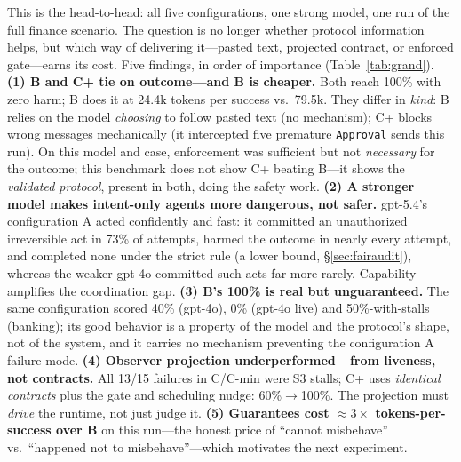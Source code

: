 \documentclass{article}
\begin{document}
This is the head-to-head: all five configurations, one strong model, one run of the full finance scenario. The question is no longer whether protocol information helps, but which way of delivering it---pasted text, projected contract, or enforced gate---earns its cost. Five findings, in order of importance (Table~\ref{tab:grand}). \textbf{(1) B and C+ tie on outcome---and B is cheaper.} Both reach 100\% with zero harm; B does it at 24.4k tokens per success vs.\ 79.5k. They differ in \emph{kind}: B relies on the model \emph{choosing} to follow pasted text (no mechanism); C+ blocks wrong messages mechanically (it intercepted five premature \texttt{Approval} sends this run). On this model and case, enforcement was sufficient but not \emph{necessary} for the outcome; this benchmark does not show C+ beating B---it shows the \emph{validated protocol}, present in both, doing the safety work. \textbf{(2) A stronger model makes intent-only agents more dangerous, not safer.} gpt-5.4's configuration A acted confidently and fast: it committed an unauthorized irreversible act in 73\% of attempts, harmed the outcome in nearly every attempt, and completed none under the strict rule (a lower bound, \S\ref{sec:fairaudit}), whereas the weaker gpt-4o committed such acts far more rarely. Capability amplifies the coordination gap. \textbf{(3) B's 100\% is real but unguaranteed.} The same configuration scored 40\% (gpt-4o), 0\% (gpt-4o live) and 50\%-with-stalls (banking); its good behavior is a property of the model and the protocol's shape, not of the system, and it carries no mechanism preventing the configuration A failure mode. \textbf{(4) Observer projection underperformed---from liveness, not contracts.} All 13/15 failures in C/C-min were S3 stalls; C+ uses \emph{identical contracts} plus the gate and scheduling nudge: 60\%$\to$100\%. The projection must \emph{drive} the runtime, not just judge it. \textbf{(5) Guarantees cost $\approx3\times$ tokens-per-success over B} on this run---the honest price of ``cannot misbehave'' vs.\ ``happened not to misbehave''---which motivates the next experiment.
\end{document}
